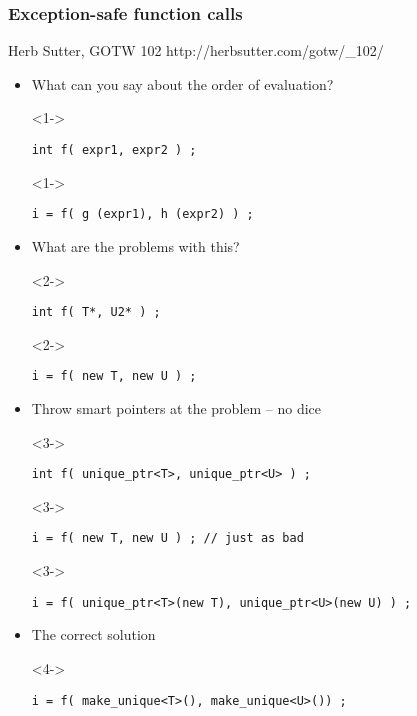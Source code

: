 \begin{frame}[fragile]
\frametitle{Exception-safe function calls}
{\scriptsize Herb Sutter, GOTW 102  \hskip 1in   http://herbsutter.com/gotw/\_102/}
\begin{itemize}
\item  <1-> What can you say about the order of evaluation?
\item[]<1-> {\scriptsize\begin{verbatim}int f( expr1, expr2 ) ;\end{verbatim}}
\item[]<1-> {\scriptsize\begin{verbatim}i = f( g (expr1), h (expr2) ) ;\end{verbatim}}
\item  <2-> What are the problems with this?
\item[]<2-> {\scriptsize\begin{verbatim}int f( T*, U2* ) ;\end{verbatim}}
\item[]<2-> {\scriptsize\begin{verbatim}i = f( new T, new U ) ;\end{verbatim}}
\item  <3-> Throw smart pointers at the problem -- no dice
\item[]<3-> {\scriptsize\begin{verbatim}int f( unique_ptr<T>, unique_ptr<U> ) ;\end{verbatim}}
\item[]<3-> {\scriptsize\begin{verbatim}i = f( new T, new U ) ; // just as bad\end{verbatim}}
\item[]<3-> {\scriptsize\begin{verbatim}i = f( unique_ptr<T>(new T), unique_ptr<U>(new U) ) ;\end{verbatim}}
\item  <4-> The correct solution
\item[]<4-> {\scriptsize\begin{verbatim}i = f( make_unique<T>(), make_unique<U>()) ;\end{verbatim}}
\end{itemize}

\end{frame}

